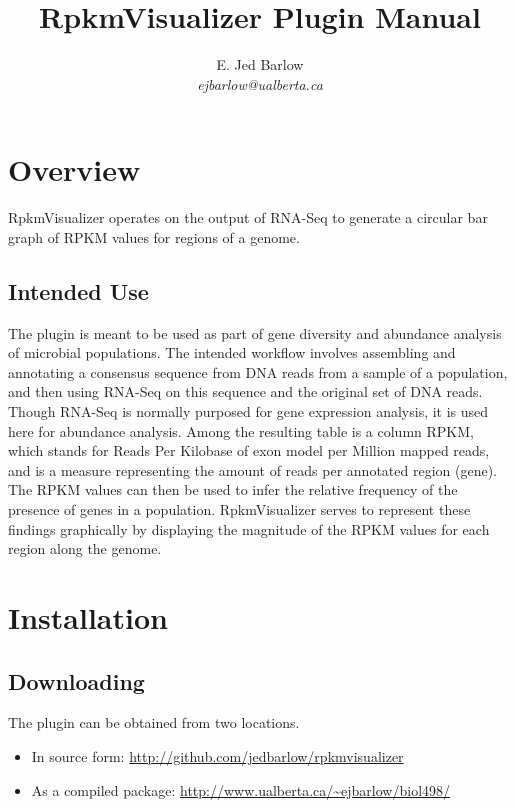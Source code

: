 \documentclass[12pt,letterpaper]{article}
\author{
    E. Jed Barlow\\
    \textit{ejbarlow@ualberta.ca}
}
\title{RpkmVisualizer Plugin Manual}
\begin{document}
\maketitle

\hfill

\tableofcontents

\newpage
\section{Overview}


RpkmVisualizer operates on the output of RNA-Seq to generate a circular bar
graph of RPKM values for regions of a genome.

\subsection{Intended Use}

The plugin is meant to be used as part of gene diversity and abundance analysis
of microbial populations.  The intended workflow involves assembling and
annotating a consensus sequence from DNA reads from a sample of a population,
and then using RNA-Seq on this sequence and the original set of DNA reads.
Though RNA-Seq is normally purposed for gene expression analysis, it is used
here for abundance analysis.  Among the resulting table is a column RPKM, which
stands for Reads Per Kilobase of exon model per Million mapped reads, and is a
measure representing the amount of reads per annotated region (gene).  The RPKM
values can then be used to infer the relative frequency of the presence of
genes in a population.  RpkmVisualizer serves to represent these findings
graphically by displaying the magnitude of the RPKM values for each region
along the genome.

\section{Installation}

\subsection{Downloading}

The plugin can be obtained from two locations.

\begin{itemize}
\item
    In source form: \url{http://github.com/jedbarlow/rpkmvisualizer}
\item
    As a compiled package: \url{http://www.ualberta.ca/~ejbarlow/biol498/}
\end{itemize}
\end{document}
